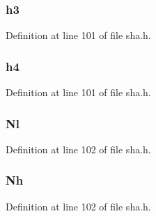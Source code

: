 \subsubsection[{\texorpdfstring{h3}{h3}}]{ h3}\hypertarget{struct_s_h_astate__st_ad4fdef9330444e26a023ca2ab4f12d93}{}\label{struct_s_h_astate__st_ad4fdef9330444e26a023ca2ab4f12d93}


Definition at line 101 of file sha.\+h.

\subsubsection[{\texorpdfstring{h4}{h4}}]{ h4}\hypertarget{struct_s_h_astate__st_a429aad789194a84a379cba13ed6f7124}{}\label{struct_s_h_astate__st_a429aad789194a84a379cba13ed6f7124}


Definition at line 101 of file sha.\+h.

\subsubsection[{\texorpdfstring{Nl}{Nl}}]{ Nl}\hypertarget{struct_s_h_astate__st_a68e0afc627fc16aa87fff8dbba1be42e}{}\label{struct_s_h_astate__st_a68e0afc627fc16aa87fff8dbba1be42e}


Definition at line 102 of file sha.\+h.

\subsubsection[{\texorpdfstring{Nh}{Nh}}]{ Nh}\hypertarget{struct_s_h_astate__st_a29a417b9afaabf41fd980b3424c91755}{}\label{struct_s_h_astate__st_a29a417b9afaabf41fd980b3424c91755}


Definition at line 102 of file sha.\+h.

